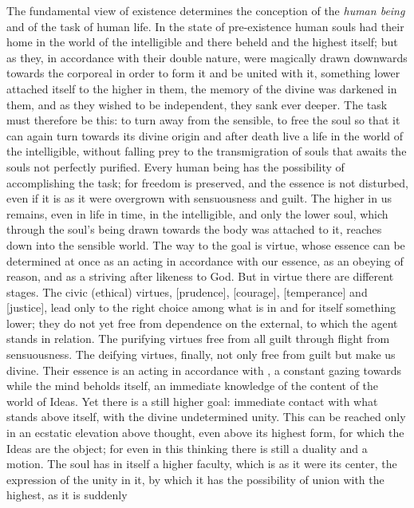 The fundamental view of existence determines the conception of the
\emph{human being} and of the task of human life. In the state of
pre-existence human souls had their home in the world of the
intelligible and there beheld  and the highest itself; but as
they, in accordance with their double nature, were magically drawn
downwards towards the corporeal in order to form it and be united with
it, something lower attached itself to the higher in them, the memory
of the divine was darkened in them, and as they wished to be
independent, they sank ever deeper. The task must therefore be this: to
turn away from the sensible, to free the soul so that it can again turn
towards its divine origin and after death live a life in the
world of the intelligible, without falling prey to the transmigration
of souls that awaits the souls not perfectly purified. Every human
being has the possibility of accomplishing the task; for freedom is
preserved, and the essence is not disturbed, even if it is as it were
overgrown with sensuousness and guilt. The higher in us remains, even
in life in time, in the intelligible, and only the lower soul, which
through the soul's being drawn towards the body was attached to it,
reaches down into the sensible world. The way to the goal is virtue,
whose essence can be determined at once as an acting in accordance with
our essence, as an obeying of reason, and as a striving after likeness
to God. But in virtue there are different stages. The civic (ethical)
virtues,  [prudence],  [courage],  [temperance] and
 [justice], lead only to the right choice among what is in and
for itself something lower; they do not yet free from dependence on the
external, to which the agent stands in relation. The purifying virtues
free from all guilt through flight from sensuousness. The deifying
virtues, finally, not only free from guilt but make us divine. Their
essence is an acting in accordance with \emph{}, a constant gazing
towards  while the mind beholds itself, an immediate
knowledge of the content of the world of Ideas. Yet there is a still
higher goal: immediate contact with what stands above  itself,
with the divine undetermined unity. This can be reached only in an
ecstatic elevation above thought, even above its highest form, for which
the Ideas are the object; for even in this thinking there is still a
duality and a motion. The soul has in itself a higher faculty, which is
as it were its center, the expression of the unity in it, by which it
has the possibility of union with the highest, as it is suddenly

